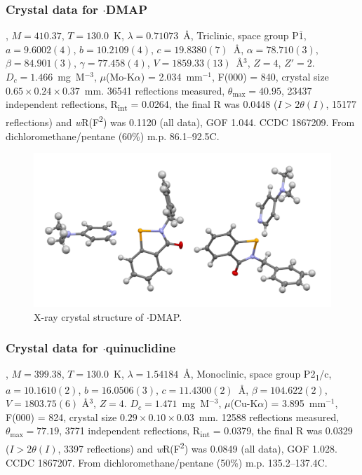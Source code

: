\begin{refsection}
    \subsubsection{Crystal data for \texorpdfstring{$ \cdot $DMAP}{C21H21N3OSe}}
    , $M=410.37$, $T=130.0$~K, $ \lambda=0.71073 $~\AA, Triclinic, space group P$\bar{1}$, $a = 9.6002(4)$, $b = 10.2109(4)$, $c = 19.8380(7)$~\AA, $\alpha = 78.710(3)$\degree, $\beta = 84.901(3)$\degree, $\gamma = 77.458(4)$\degree, $V = 1859.33(13)$~\AA$^{3}$, $Z = 4$, $Z\prime = 2$.
    $D_{c}= 1.466$~mg~M$^{-3}$, $\mu$(Mo-K$\alpha$) = 2.034~mm$^{-1}$, F(000) = 840, crystal size $0.65 \times 0.24 \times 0.37$~mm.
    36541 reflections measured, $\theta_{\max} = 40.95$\degree, 23437 independent reflections, R\textsubscript{int} = 0.0264, the final R was 0.0448 ($I > 2\theta(I)$, 15177 reflections) and \textit{w}R(F\textsuperscript{2}) was 0.1120 (all data), GOF 1.044.
    CCDC 1867209.
    From dichloromethane/pentane (60\%) m.p. 86.1--92.5\degree{}C.
    
    \begin{figure}
      \includegraphics[width=0.6\linewidth]{Figures/ebs-bn-dmap-xtal.pdf}
      \caption{X-ray crystal structure of \texorpdfstring{$ \cdot $DMAP}{C21H21N3OSe}.}
    \end{figure}
    
    \subsubsection{Crystal data for \texorpdfstring{$ \cdot $quinuclidine}{C21H24N2OSe}}
    , $M=399.38$, $T=130.0$~K, $\lambda=1.54184$~\AA, Monoclinic, space group P2\textsubscript{1}/c, $a = 10.1610(2)$, $b = 16.0506(3)$, $c = 11.4300(2)$~\AA, $\beta = 104.622(2)$\degree, $V = 1803.75(6)$ \AA$^{3}$, $Z = 4$.
    $D_{c}= 1.471$~mg~M$^{-3}$, $\mu$(Cu-K$\alpha$) = 3.895~mm$^{-1}$, F(000) = 824, crystal size $0.29 \times 0.10 \times 0.03$~mm.
    12588 reflections measured, $\theta_{\max} = 77.19$\degree, 3771 independent reflections, R\textsubscript{int} = 0.0379, the final R was 0.0329 ($I > 2\theta(I)$, 3397 reflections) and \textit{w}R(F\textsuperscript{2}) was 0.0849 (all data), GOF 1.028.
    CCDC 1867207.
    From dichloromethane/pentane (50\%) m.p. 135.2--137.4\degree{}C.
    

\end{refsection}
